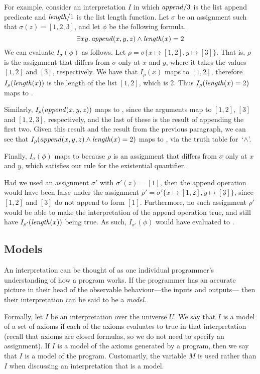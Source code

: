 For example,
consider an interpretation $I$ in which
$\text{\textit{append}}/3$ is the list append predicate
and $\text{\textit{length}}/1$ is the list length function.
Let $\sigma$ be an assignment such that $\sigma(z) = [1, 2, 3]$,
and let $\phi$ be the following formula.
\[
\exists x y.\, \text{\textit{append}}(x, y, z) \land \text{\textit{length}}(x) = 2
\]
We can evaluate $I_\sigma(\phi)$ as follows.
Let $\rho = \sigma \{ x \mapsto [1, 2], y \mapsto [3] \}$.
That is, $\rho$ is the assignment
that differs from $\sigma$ only at $x$ and $y$,
where it takes the values $[1, 2]$ and $[3]$, respectively.
We have that $I_{\rho}(x)$ maps to $[1, 2]$,
therefore $I_{\rho}(\text{\textit{length}}(x))$
is the length of the list $[1, 2]$, which is 2.
Thus $I_{\rho}(\text{\textit{length}}(x) = 2)$ maps to .

Similarly,
$I_{\rho}(\text{\textit{append}}(x, y, z))$ maps to ,
since the arguments map to
$[1, 2]$, $[3]$ and $[1, 2, 3]$, respectively,
and the last of these is the result of
appending the first two.
Given this result and the result from the previous paragraph,
we can see that
$I_{\rho}(\text{\textit{append}}(x, y, z) \land \text{\textit{length}}(x) = 2)$
maps to ,
via the truth table for~`$\land$'.

Finally, $I_\sigma(\phi)$ maps to  because
$\rho$ is an assignment that differs from $\sigma$
only at $x$ and $y$,
which satisfies our rule for the existential quantifier.

Had we used an assignment $\sigma'$ with $\sigma'(z) = [1]$,
then the append operation would have been false
under the assignment $\rho' = \sigma' \{ x \mapsto [1,2], y \mapsto [3] \}$,
since $[1, 2]$ and $[3]$ do not append to form $[1]$.
Furthermore,
no such assignment $\rho'$ would be able to make
the interpretation of the append operation true,
and still have $I_{\rho'}(\text{\textit{length}}(x))$ being true.
As such, $I_{\sigma'}(\phi)$ would have evaluated to .


\subsection{Models}
\label{sec:models}

An interpretation can be thought of as
one individual programmer's understanding of
how a program works.
If the programmer has an accurate picture in their head
of the observable behaviour---the inputs and outputs---%
then their interpretation can be said to be a
\emph{model\label{gi:model}}.

Formally,
let $I$ be an interpretation over the universe $U$.
We say that $I$ is a model of a set of axioms
if each of the axioms evaluates to true
in that interpretation
(recall that axioms are closed formulas,
so we do not need to specify an assignment).
If $I$ is a model of the axioms generated by a program,
then we say that $I$ is a model of the program.
Customarily, the variable $M$ is used rather than $I$
when discussing an interpretation that is a model.

